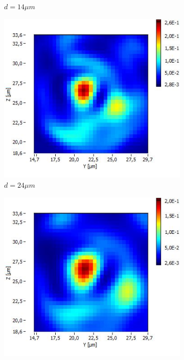 \documentclass[a4paper,11pt]{article}
\begin{document}
\begin{figure}[htb]
\begin{subfigure}[b]{.19\linewidth}
    \caption{$d=14\mu m$}
  \end{subfigure}
  \begin{subfigure}[b]{.19\linewidth}
    \centering
    \includegraphics[width=\textwidth]{Fibre6/scan_008_g1.jpg}
    \caption{$d=24\mu m$}
  \end{subfigure}
  \begin{subfigure}[b]{.19\linewidth}
    \centering
    \includegraphics[width=\textwidth]{Fibre6/scan_009_g1.jpg}

\end{subfigure}
\end{figure}
\end{document}

